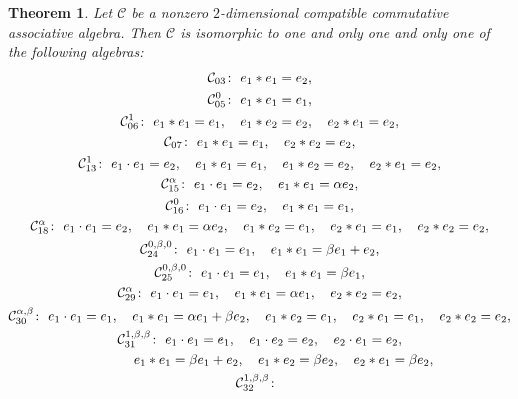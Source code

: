 \documentclass[10pt,a4paper]{amsart}
\numberwithin{equation}{section}
\newtheorem{Theorem}{Theorem}[section]
\begin{document}
\begin{Theorem}\label{comasscom2}
Let $\mathcal{C}$ be a nonzero $2$-dimensional compatible commutative associative algebra.
Then $\mathcal{C}$ is isomorphic to one and only one and only one of the following
algebras:
\begin{gather*}
 \mathcal{C}_{03} \colon\ e_{1}\ast e_{1} =e_{2}, \\
 \mathcal{C}_{05}^{0} \colon\ e_{1}\ast e_{1} =e_{1}, \\
 \mathcal{C}_{06}^{1} \colon\ e_{1} \ast e_{1} =e_{1}, \quad e_{1} \ast e_{2} = e_{2}, \quad e_{2} \ast e_{1} =e_{2}, \\
 \mathcal{C}_{07} \colon\ e_{1}\ast e_{1} =e_{1},\quad e_{2}\ast e_{2}=e_{2}, \\
 \mathcal{C}_{13}^{1 } \colon\
 e_{1}\cdot e_{1}=e_{2} , \quad
 e_{1}\ast e_{1}= e_{1} , \quad e_{1}\ast e_{2}=e_{2} , \quad e_{2}\ast
e_{1}= e_{2},
\\
 \mathcal{C}_{15}^{\alpha } \colon\
 e_{1}\cdot e_{1}=e_{2} , \quad
 e_{1}\ast e_{1}=\alpha e_{2}, \\
 \mathcal{C}_{16}^{0 } \colon\
 e_{1}\cdot e_{1}=e_{2} , \quad
 e_{1}\ast e_{1}=e_{1},
\\
 \mathcal{C}_{18}^{\alpha } \colon\
 e_{1}\cdot e_{1}=e_{2} , \quad
 e_{1}\ast e_{1}=\alpha e_{2} , \quad e_{1}\ast e_{2}=e_{1} , \quad e_{2}\ast
e_{1}=e_{1} , \quad e_{2}\ast e_{2}=e_{2},
\\
 \mathcal{C}_{24}^{0 ,\beta ,0 } \colon\
 e_{1}\cdot e_{1}=e_{1} , \quad
 e_{1}\ast e_{1}=\beta e_{1}+e_{2},\\
 \mathcal{C}_{25}^{0 ,\beta ,0 } \colon\
 e_{1}\cdot e_{1}=e_{1} , \quad
 e_{1}\ast e_{1}=\beta e_{1},
\\
 \mathcal{C}_{29}^{\alpha } \colon\
 e_{1}\cdot e_{1}=e_{1} , \quad
 e_{1}\ast e_{1}=\alpha e_{1} , \quad e_{2}\ast e_{2}=e_{2},
 \\
 \mathcal{C}_{30}^{\alpha ,\beta } \colon\
 e_{1}\cdot e_{1}=e_{1} , \quad
 e_{1}\ast e_{1}=\alpha e_{1}+\beta e_{2} , \quad e_{1}\ast e_{2}=e_{1} , \quad
e_{2}\ast e_{1}=e_{1} , \quad e_{2}\ast e_{2}=e_{2},
\\
 \mathcal{C}_{31}^{1 ,\beta ,\beta } \colon\
 e_{1}\cdot e_{1}=e_{1} , \quad e_{1}\cdot e_{2}= e_{2} , \quad e_{2}\cdot
e_{1}=e_{2} , \\
\hphantom{\mathcal{C}_{31}^{1 ,\beta ,\beta } \colon} \
 e_{1}\ast e_{1}=\beta e_{1}+e_{2} ,\quad e_{1}\ast e_{2}=\beta e_{2} , \quad
e_{2}\ast e_{1}=\beta e_{2},
\\
 \mathcal{C}_{32}^{1 ,\beta ,\beta } \colon\

\end{gather*}
\end{Theorem}
\end{document}
